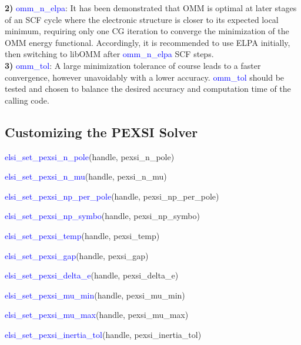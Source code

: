 \documentclass{report}
\begin{document}
\textbf{2)} \textcolor{blue}{omm\_n\_elpa}:  It has been demonstrated that OMM is optimal at later stages of an SCF cycle where the electronic structure is closer to its expected local minimum, requiring only one CG iteration to converge the minimization of the OMM energy functional.  Accordingly, it is recommended to use ELPA initially, then switching to libOMM after \textcolor{blue}{omm\_n\_elpa} SCF steps.\\

\textbf{3)} \textcolor{blue}{omm\_tol}:  A large minimization tolerance of course leads to a faster convergence, however unavoidably with a lower accuracy.  \textcolor{blue}{omm\_tol} should be tested and chosen to balance the desired accuracy and computation time of the calling code.\\

\subsection{Customizing the PEXSI Solver}
\label{subsec:setter_pexsi}
\begin{labeling}{\hspace{6cm}}
\item [\hspace{0.3cm} \textcolor{blue}{elsi\_set\_pexsi\_n\_pole}(handle, pexsi\_n\_pole)]
\item [\hspace{0.3cm} \textcolor{blue}{elsi\_set\_pexsi\_n\_mu}(handle, pexsi\_n\_mu)]
\item [\hspace{0.3cm} \textcolor{blue}{elsi\_set\_pexsi\_np\_per\_pole}(handle, pexsi\_np\_per\_pole)]
\item [\hspace{0.3cm} \textcolor{blue}{elsi\_set\_pexsi\_np\_symbo}(handle, pexsi\_np\_symbo)]
\item [\hspace{0.3cm} \textcolor{blue}{elsi\_set\_pexsi\_temp}(handle, pexsi\_temp)]
\item [\hspace{0.3cm} \textcolor{blue}{elsi\_set\_pexsi\_gap}(handle, pexsi\_gap)]
\item [\hspace{0.3cm} \textcolor{blue}{elsi\_set\_pexsi\_delta\_e}(handle, pexsi\_delta\_e)]
\item [\hspace{0.3cm} \textcolor{blue}{elsi\_set\_pexsi\_mu\_min}(handle, pexsi\_mu\_min)]
\item [\hspace{0.3cm} \textcolor{blue}{elsi\_set\_pexsi\_mu\_max}(handle, pexsi\_mu\_max)]
\item [\hspace{0.3cm} \textcolor{blue}{elsi\_set\_pexsi\_inertia\_tol}(handle, pexsi\_inertia\_tol)]
\end{labeling}
\end{document}
